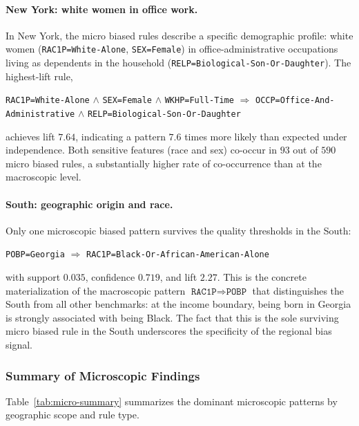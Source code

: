\paragraph{New York: white women in office work.} In New York, the micro biased rules describe a specific demographic profile: white women (\texttt{RAC1P=White-Alone}, \texttt{SEX=Female}) in office-administrative occupations living as dependents in the household (\texttt{RELP=Biological-Son-Or-Daughter}). The highest-lift rule,
\begin{center}
\texttt{RAC1P=White-Alone} $\wedge$ \texttt{SEX=Female} $\wedge$ \texttt{WKHP=Full-Time} $\Rightarrow$ \texttt{OCCP=Office-And-Administrative} $\wedge$ \texttt{RELP=Biological-Son-Or-Daughter}
\end{center}
achieves lift $7.64$, indicating a pattern $7.6$ times more likely than expected under independence. Both sensitive features (race and sex) co-occur in $93$ out of $590$ micro biased rules, a substantially higher rate of co-occurrence than at the macroscopic level.

\paragraph{South: geographic origin and race.} Only one microscopic biased pattern survives the quality thresholds in the South:
\begin{center}
\texttt{POBP=Georgia} $\Rightarrow$ \texttt{RAC1P=Black-Or-African-American-Alone}
\end{center}
with support $0.035$, confidence $0.719$, and lift $2.27$. This is the concrete materialization of the macroscopic pattern $\texttt{RAC1P} \Rightarrow \texttt{POBP}$ that distinguishes the South from all other benchmarks: at the income boundary, being born in Georgia is strongly associated with being Black. The fact that this is the sole surviving micro biased rule in the South underscores the specificity of the regional bias signal.

\subsubsection{Summary of Microscopic Findings}

Table~\ref{tab:micro-summary} summarizes the dominant microscopic patterns by geographic scope and rule type.

